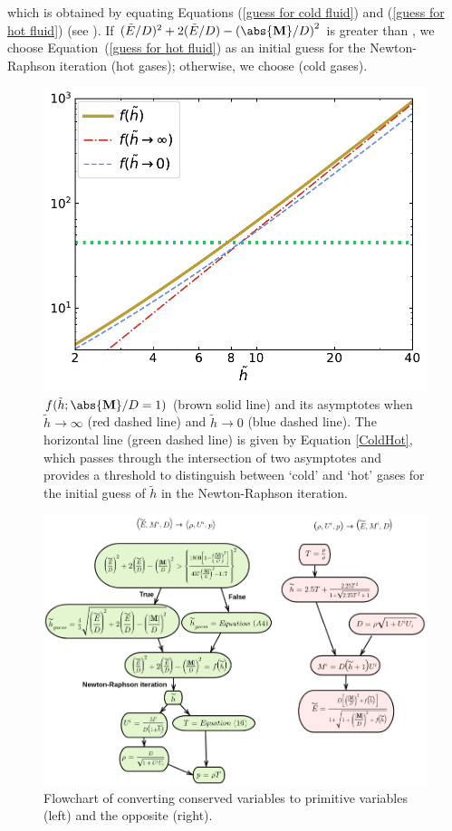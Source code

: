 which is obtained by equating Equations (\ref{guess for cold fluid}) and (\ref{guess for hot fluid}) (see ). If $(\tilde{E}/D)^2+2(\tilde{E}/D)-\left(\abs{\mathbf{M}}/D\right)^2$ is greater than , we choose Equation~(\ref{guess for hot fluid}) as an initial guess for the Newton-Raphson iteration (hot gases); otherwise, we choose  (cold gases).
\begin{figure}
\includegraphics[scale=0.7]{figures/FunHTilde.pdf}
\caption{$f(\tilde{h};\abs{\mathbf{M}}/D=1)$ (brown solid line) and its asymptotes when $\tilde{h}\rightarrow \infty$ (red dashed line) and $\tilde{h}\rightarrow 0$ (blue dashed line). The horizontal line (green dashed line) is given by Equation \ref{ColdHot}, which passes through the intersection of two asymptotes and provides a threshold to distinguish between `cold' and `hot' gases for the initial guess of $\tilde{h}$ in the Newton-Raphson iteration.}
\label{fig:FunHTilde}
\end{figure}


\begin{figure}
\includegraphics[width=\linewidth]{figures/screenshot.png}
\caption{Flowchart of converting conserved variables to primitive variables (left) and the opposite (right).}
\label{fig:flowchart}
\end{figure}

